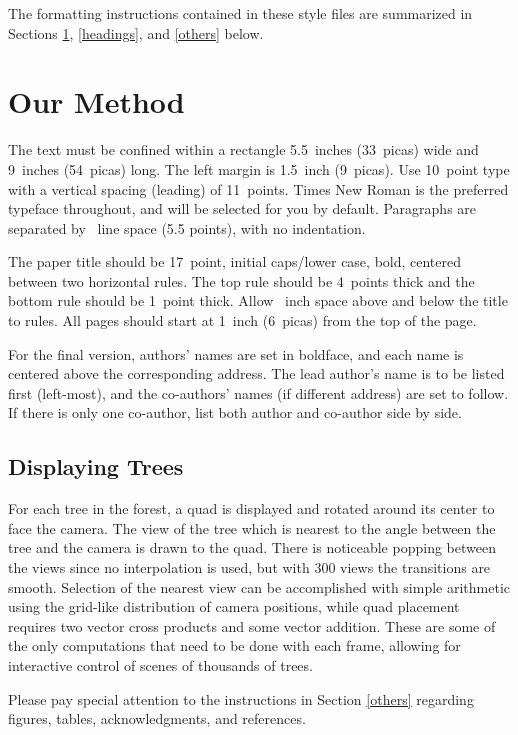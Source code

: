 \documentclass{article}
\begin{document}
The formatting instructions contained in these style files are summarized in
Sections \ref{gen_inst}, \ref{headings}, and \ref{others} below.


\section{Our Method}
\label{gen_inst}


The text must be confined within a rectangle 5.5~inches (33~picas) wide and
9~inches (54~picas) long. The left margin is 1.5~inch (9~picas).  Use 10~point
type with a vertical spacing (leading) of 11~points.  Times New Roman is the
preferred typeface throughout, and will be selected for you by default.
Paragraphs are separated by ~line space (5.5 points), with no
indentation.


The paper title should be 17~point, initial caps/lower case, bold, centered
between two horizontal rules. The top rule should be 4~points thick and the
bottom rule should be 1~point thick. Allow ~inch space above and
below the title to rules. All pages should start at 1~inch (6~picas) from the
top of the page.


For the final version, authors' names are set in boldface, and each name is
centered above the corresponding address. The lead author's name is to be listed
first (left-most), and the co-authors' names (if different address) are set to
follow. If there is only one co-author, list both author and co-author side by
side.
\subsection{ Displaying Trees}

For each tree in the forest, a quad is displayed and rotated around its center to face the camera. The view of the tree which is nearest to the angle between the tree and the camera is drawn to the quad. There is noticeable popping between the views since no interpolation is used, but with 300 views the transitions are smooth. Selection of the nearest view can be accomplished with simple arithmetic using the grid-like distribution of camera positions, while quad placement requires two vector cross products and some vector addition. These are some of the only computations that need to be done with each frame, allowing for interactive control of scenes of thousands of trees.



Please pay special attention to the instructions in Section \ref{others}
regarding figures, tables, acknowledgments, and references.
\end{document}
